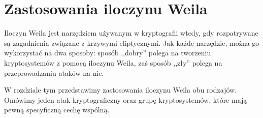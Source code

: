 \chapter{Zastosowania iloczynu Weila}

\noindent
Iloczyn Weila jest narzędziem używanym w kryptografii wtedy,
gdy rozpatrywane są zagadnienia związane z krzywymi eliptycznymi.
Jak każde narzędzie, można go wykorzystać na dwa sposoby:
sposób ,,dobry'' polega na tworzeniu kryptosystemów z pomocą iloczynu Weila,
zaś sposób ,,zły'' polega na przeprowadzaniu ataków na nie.

\noindent
W rozdziale tym przedstawimy zastosowania iloczynu Weila obu rodzajów.
Omówimy jeden atak kryptograficzny
oraz grupę kryptosystemów,
które mają pewną specyficzną cechę wspólną.








